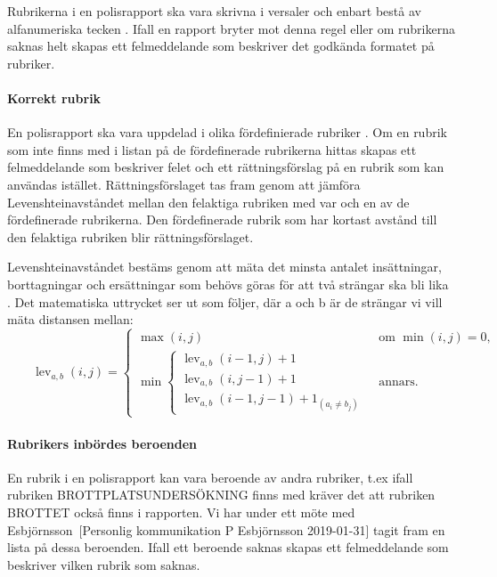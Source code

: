 \documentclass[swedish]{maucsthesis}
\begin{document}
Rubrikerna i en polisrapport ska vara skrivna i versaler och enbart bestå av 
alfanumeriska tecken \cite{durtva:2017}. Ifall en rapport bryter mot denna regel 
eller om rubrikerna saknas helt skapas ett felmeddelande som beskriver det godkända
formatet på rubriker.

\paragraph*{Korrekt rubrik}

En polisrapport ska vara uppdelad i olika fördefinierade rubriker
\cite{durtva:2017}. Om en rubrik som inte finns med i listan på de
fördefinerade \cite{per:2018} rubrikerna hittas skapas ett felmeddelande som beskriver felet och
ett rättningsförslag på en rubrik som kan användas istället. Rättningsförslaget
tas fram genom att jämföra Levenshteinavståndet mellan den felaktiga rubriken
med var och en av de fördefinerade rubrikerna. Den fördefinerade rubrik som har
kortast avstånd till den felaktiga rubriken blir rättningsförslaget.

Levenshteinavståndet bestäms genom att mäta det minsta antalet insättningar, borttagningar och ersättningar
som behövs göras för att två strängar ska bli lika \cite{navarro:2001}.
Det matematiska uttrycket ser ut som följer, där a och b är de strängar vi vill mäta distansen mellan:
\[\qquad\operatorname{lev}_{a,b}(i,j) = \begin{cases}
  \max(i,j) & \text{ om } \min(i,j)=0, \\
  \min \begin{cases}
          \operatorname{lev}_{a,b}(i-1,j) + 1 \\
          \operatorname{lev}_{a,b}(i,j-1) + 1 \\
          \operatorname{lev}_{a,b}(i-1,j-1) + 1_{(a_i \neq b_j)}
       \end{cases} & \text{ annars.}
\end{cases}\]

\paragraph*{Rubrikers inbördes beroenden}

En rubrik i en polisrapport kan vara beroende av andra rubriker, t.ex ifall
rubriken BROTTPLATSUNDERSÖKNING finns med kräver det att rubriken BROTTET också
finns i rapporten. Vi har under ett möte med Esbjörnsson~[Personlig kommunikation P Esbjörnsson 2019-01-31]
tagit fram en lista på dessa beroenden. Ifall ett beroende saknas skapas ett felmeddelande
som beskriver vilken rubrik som saknas.
\end{document}
